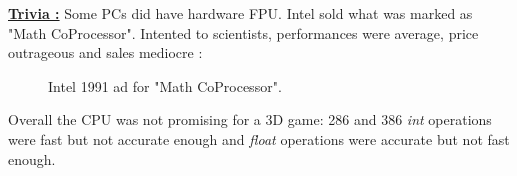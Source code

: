 \documentclass[book.tex]{subfiles}
\begin{document}
\bigskip  
\break
\textbf{\underline{Trivia :}} Some PCs did have hardware FPU. Intel sold what was marked as "Math CoProcessor". Intented to scientists, performances were average, price outrageous and sales mediocre :\\
\begin{figure}[H]
\centering
\caption{Intel 1991 ad for "Math CoProcessor".}
\label{fig:fp_internals}
\end{figure}



\bigskip
Overall the CPU was not promising for a 3D game: 286 and 386 \emph{int} operations were fast but not accurate enough and \emph{float} operations were accurate but not fast enough.
   
\end{document}
